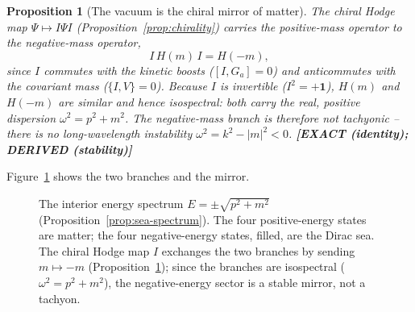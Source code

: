 \documentclass[11pt,oneside]{book}
\newcommand{\status}[1]{{\sffamily\bfseries\color{statuscol}[#1]}}
\theoremstyle{plain}
\newtheorem{proposition}[theorem]{Proposition}
\theoremstyle{definition}
\theoremstyle{remark}
\begin{document}
\begin{proposition}[The vacuum is the chiral mirror of matter]
\label{prop:sea-mirror}
The chiral Hodge map $\Psi\mapsto I\Psi I$ (Proposition~\ref{prop:chirality}) carries
the positive-mass operator to the negative-mass operator,
\[
  I\,H(m)\,I=H(-m),
\]
since $I$ commutes with the kinetic boosts ($[I,G_a]=0$) and anticommutes with the
covariant mass ($\{I,V\}=0$). Because $I$ is invertible ($I^2=+\mathbf 1$), $H(m)$ and
$H(-m)$ are \emph{similar} and hence isospectral: both carry the real, positive
dispersion $\omega^2=p^2+m^2$. The negative-mass branch is therefore not tachyonic --
there is no long-wavelength instability $\omega^2=k^2-|m|^2<0$. \status{EXACT
(identity); DERIVED (stability)}
\end{proposition}

Figure~\ref{fig:sea} shows the two branches and the mirror.

\begin{figure}[tbp]
\centering
{}
\caption{The interior energy spectrum $E=\pm\sqrt{p^2+m^2}$
(Proposition~\ref{prop:sea-spectrum}). The four positive-energy states are matter;
the four negative-energy states, filled, are the Dirac sea. The chiral Hodge map
$I$ exchanges the two branches by sending $m\mapsto-m$
(Proposition~\ref{prop:sea-mirror}); since the branches are isospectral
($\omega^2=p^2+m^2$), the negative-energy sector is a stable mirror, not a tachyon.}
\label{fig:sea}
\end{figure}
\end{document}
